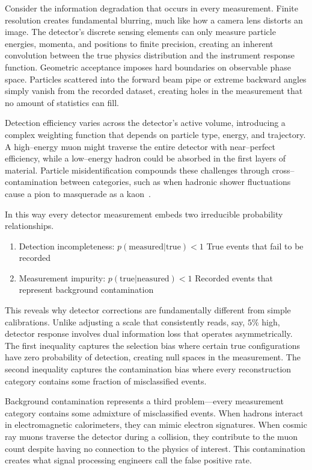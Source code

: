 \begin{definition}
    Consider the information degradation that occurs in every measurement. 
    Finite resolution creates fundamental blurring, much like how a camera lens distorts an image.
    The detector's discrete sensing elements can only measure particle energies, momenta, and positions to finite precision, creating an inherent convolution between the true physics distribution and the instrument response function.
    Geometric acceptance imposes hard boundaries on observable phase space.
    Particles scattered into the forward beam pipe or extreme backward angles simply vanish from the recorded dataset, creating holes in the measurement that no amount of statistics can fill.
    
    Detection efficiency varies across the detector's active volume, introducing a complex weighting function that depends on particle type, energy, and trajectory.
    A high--energy muon might traverse the entire detector with near--perfect efficiency, while a low--energy hadron could be absorbed in the first layers of material.
    Particle misidentification compounds these challenges through cross--contamination between categories, such as when hadronic shower fluctuations cause a pion to masquerade as a kaon~\cite{belle_collaboration_precision_2013}.

    In this way every detector measurement embeds two irreducible probability relationships.
    \begin{enumerate}
        \item Detection incompleteness: \(p(\text{measured}|\text{true}) < 1\) True events that fail to be recorded
        \item Measurement impurity: \(p(\text{true}|\text{neasured}) < 1\) Recorded events that represent background contamination
    \end{enumerate}
    This reveals why detector corrections are fundamentally different from simple calibrations.
    Unlike adjusting a scale that consistently reads, say, \(5\%\) high, detector response involves dual information loss that operates asymmetrically.
    The first inequality captures the selection bias where certain true configurations have zero probability of detection, creating null spaces in the measurement.
    The second inequality captures the contamination bias where every reconstruction category contains some fraction of misclassified events.
    
    Background contamination represents a third problem---every measurement category contains some admixture of misclassified events.
    When hadrons interact in electromagnetic calorimeters, they can mimic electron signatures.
    When cosmic ray muons traverse the detector during a collision, they contribute to the muon count despite having no connection to the physics of interest.
    This contamination creates what signal processing engineers call the false positive rate.
    

\end{definition}
